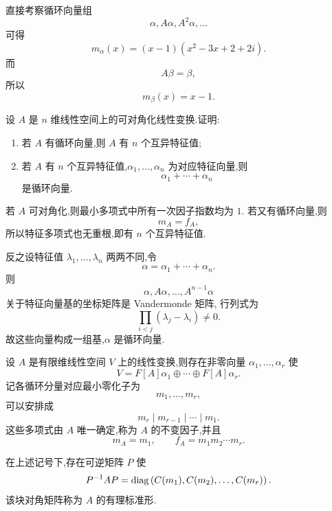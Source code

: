 \begin{solution}
直接考察循环向量组
\[
\alpha,A\alpha,A^2\alpha,\ldots
\]
可得
\[
\boxed{
m_\alpha(x)
=
(x-1)(x^2-3x+2+2i)
}.
\]
而
\[
A\beta=\beta,
\]
所以
\[
\boxed{m_\beta(x)=x-1}.
\]
\end{solution}


\begin{example}
设 $A$ 是 $n$ 维线性空间上的可对角化线性变换.证明:
\begin{enumerate}
    \item 若 $A$ 有循环向量,则 $A$ 有 $n$ 个互异特征值;
    \item 若 $A$ 有 $n$ 个互异特征值,$\alpha_1,\ldots,\alpha_n$
    为对应特征向量,则
    \[
    \alpha_1+\cdots+\alpha_n
    \]
    是循环向量.
\end{enumerate}
\end{example}
\exampleblank

\begin{solution}
若 $A$ 可对角化,则最小多项式中所有一次因子指数均为 $1$.
若又有循环向量,则
\[
m_A=f_A,
\]
所以特征多项式也无重根,即有 $n$ 个互异特征值.

反之设特征值 $\lambda_1,\ldots,\lambda_n$ 两两不同,令
\[
\alpha=\alpha_1+\cdots+\alpha_n.
\]
则
\[
\alpha,A\alpha,\ldots,A^{n-1}\alpha
\]
关于特征向量基的坐标矩阵是 Vandermonde 矩阵,
行列式为
\[
\displaystyle\prod_{i<j}(\lambda_j-\lambda_i)\neq0.
\]
故这些向量构成一组基,$\alpha$ 是循环向量.
\end{solution}


\begin{theorem}
设 $A$ 是有限维线性空间 $V$ 上的线性变换,则存在非零向量
$\alpha_1,\ldots,\alpha_r$ 使
\[
V
=
F[A]\alpha_1\oplus\cdots\oplus F[A]\alpha_r.
\]
记各循环分量对应最小零化子为
\[
m_1,\ldots,m_r,
\]
可以安排成
\[
m_r\mid m_{r-1}\mid\cdots\mid m_1.
\]
这些多项式由 $A$ 唯一确定,称为 $A$ 的不变因子,并且
\[
m_A=m_1,
\qquad
f_A=m_1m_2\cdots m_r.
\]
\end{theorem}

\begin{theorem}
在上述记号下,存在可逆矩阵 $P$ 使
\[
P^{-1}AP
=
\operatorname{diag}\left(C(m_1),C(m_2),\ldots,C(m_r)\right).
\]
该块对角矩阵称为 $A$ 的有理标准形.
\end{theorem}


